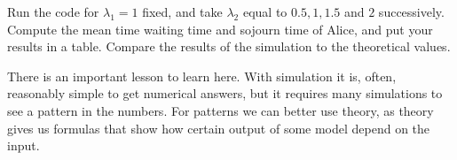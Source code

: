 \documentclass[assignments]{subfiles}
\begin{document}
\begin{exercise}
Run the code for $\lambda_{1}=1$ fixed, and take $\lambda_{2}$ equal to $0.5, 1, 1.5$ and $2$ successively. Compute the mean time waiting time and  sojourn time of Alice, and put your results in a table. Compare the results of the simulation to the theoretical values.
\begin{solution}
\end{solution}
\end{exercise}

There is an important lesson to learn here.
With simulation it is, often, reasonably simple to get numerical answers, but it requires many simulations to see a pattern in the numbers.
For patterns we can better use theory, as theory gives us formulas that show how certain output of some model depend on the input.
\end{document}
